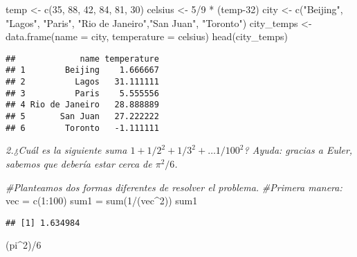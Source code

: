 \documentclass[
]{article}
\newenvironment{Shaded}{\begin{snugshade}}{\end{snugshade}}
\newcommand{\AttributeTok}[1]{\textcolor[rgb]{0.77,0.63,0.00}{#1}}
\newcommand{\CommentTok}[1]{\textcolor[rgb]{0.56,0.35,0.01}{\textit{#1}}}
\newcommand{\DecValTok}[1]{\textcolor[rgb]{0.00,0.00,0.81}{#1}}
\newcommand{\FunctionTok}[1]{\textcolor[rgb]{0.00,0.00,0.00}{#1}}
\newcommand{\NormalTok}[1]{#1}
\newcommand{\OtherTok}[1]{\textcolor[rgb]{0.56,0.35,0.01}{#1}}
\newcommand{\SpecialCharTok}[1]{\textcolor[rgb]{0.00,0.00,0.00}{#1}}
\newcommand{\StringTok}[1]{\textcolor[rgb]{0.31,0.60,0.02}{#1}}
\begin{document}
\begin{Shaded}
\begin{Highlighting}[]
\NormalTok{temp }\OtherTok{\textless{}{-}} \FunctionTok{c}\NormalTok{(}\DecValTok{35}\NormalTok{, }\DecValTok{88}\NormalTok{, }\DecValTok{42}\NormalTok{, }\DecValTok{84}\NormalTok{, }\DecValTok{81}\NormalTok{, }\DecValTok{30}\NormalTok{)}
\NormalTok{celsius }\OtherTok{\textless{}{-}} \DecValTok{5}\SpecialCharTok{/}\DecValTok{9} \SpecialCharTok{*}\NormalTok{ (temp}\DecValTok{{-}32}\NormalTok{)}
\NormalTok{city }\OtherTok{\textless{}{-}} \FunctionTok{c}\NormalTok{(}\StringTok{"Beijing"}\NormalTok{, }\StringTok{"Lagos"}\NormalTok{, }\StringTok{"Paris"}\NormalTok{, }\StringTok{"Rio de Janeiro"}\NormalTok{,}\StringTok{"San Juan"}\NormalTok{, }\StringTok{"Toronto"}\NormalTok{)}
\NormalTok{city\_temps }\OtherTok{\textless{}{-}} \FunctionTok{data.frame}\NormalTok{(}\AttributeTok{name =}\NormalTok{ city, }\AttributeTok{temperature =}\NormalTok{ celsius)}
\FunctionTok{head}\NormalTok{(city\_temps)}
\end{Highlighting}
\end{Shaded}

\begin{verbatim}
##             name temperature
## 1        Beijing    1.666667
## 2          Lagos   31.111111
## 3          Paris    5.555556
## 4 Rio de Janeiro   28.888889
## 5       San Juan   27.222222
## 6        Toronto   -1.111111
\end{verbatim}

\emph{2.¿Cuál es la siguiente suma \(1+1/2^2+1/3^2+…1/100^2\)? Ayuda:
gracias a Euler, sabemos que debería estar cerca de \(π^2/6\).}

\begin{Shaded}
\begin{Highlighting}[]
\CommentTok{\#Planteamos dos formas diferentes de resolver el problema.}
\CommentTok{\#Primera manera:}
\NormalTok{vec }\OtherTok{=} \FunctionTok{c}\NormalTok{(}\DecValTok{1}\SpecialCharTok{:}\DecValTok{100}\NormalTok{)}
\NormalTok{sum1 }\OtherTok{=} \FunctionTok{sum}\NormalTok{(}\DecValTok{1}\SpecialCharTok{/}\NormalTok{(vec}\SpecialCharTok{\^{}}\DecValTok{2}\NormalTok{))}
\NormalTok{sum1}
\end{Highlighting}
\end{Shaded}

\begin{verbatim}
## [1] 1.634984
\end{verbatim}

\begin{Shaded}
\begin{Highlighting}[]
\NormalTok{(pi}\SpecialCharTok{\^{}}\DecValTok{2}\NormalTok{)}\SpecialCharTok{/}\DecValTok{6}
\end{Highlighting}
\end{Shaded}
\end{document}
